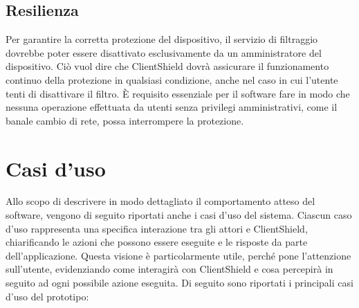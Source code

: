 \documentclass[12pt,a4paper,openright,twoside]{book}
\begin{document}
\subsection*{Resilienza}

Per garantire la corretta protezione del dispositivo, il servizio di filtraggio dovrebbe poter essere disattivato esclusivamente da un amministratore del dispositivo.
Ciò vuol dire che ClientShield dovrà assicurare il funzionamento continuo della protezione in qualsiasi condizione, anche nel caso in cui l'utente tenti di disattivare il filtro.
È requisito essenziale per il software fare in modo che nessuna operazione effettuata da utenti senza privilegi amministrativi, come il banale cambio di rete, possa interrompere la protezione.

\section{Casi d'uso}
\label{sec:casi-d-uso}

Allo scopo di descrivere in modo dettagliato il comportamento atteso del software, vengono di seguito riportati anche i casi d'uso del sistema.
Ciascun caso d'uso rappresenta una specifica interazione tra gli attori e ClientShield, chiarificando le azioni che possono essere eseguite e le risposte da parte dell'applicazione.
Questa visione è particolarmente utile, perché pone l'attenzione sull'utente, evidenziando come interagirà con ClientShield e cosa percepirà in seguito ad ogni possibile azione eseguita.
Di seguito sono riportati i principali casi d'uso del prototipo:
\end{document}
